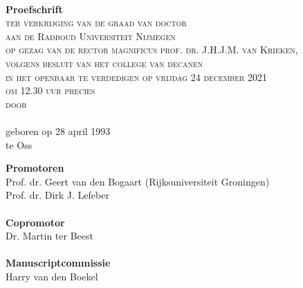 \thispagestyle{empty}
\vspace*{\fill}
\vspace{10pt}
\begin{center}
    \Huge \textcolor{SchoolColor}{\thetitle} \normalsize \\
    \vspace{100pt}
    \large \textbf{Proefschrift} \normalsize \\
    \vspace{50pt}
    \textsc{ter verkrijging van de graad van doctor\\
        aan de Radboud Universiteit Nijmegen\\
        op gezag van de rector magnificus prof. dr. J.H.J.M. van Krieken,\\
        volgens besluit van het college van decanen\\
        in het openbaar te verdedigen op vrijdag 24 december 2021\\
        om 12.30 uur precies\\
        \vspace{20pt}
        door\\
        \vspace{20pt}}
    \large \textbf{\theauthor} \normalsize \\
    \vspace{12pt}
    geboren op 28 april 1993\\
    te Oss
\end{center} \vspace*{\fill}

\newpage
\thispagestyle{empty}
\vspace{120pt}
\noindent \textbf{Promotoren}\\
\noindent Prof. dr. Geert van den Bogaart (Rijksuniversiteit Groningen)\\
\noindent Prof. dr. Dirk J. Lefeber\\
\noindent \\
\noindent \textbf{Copromotor}\\
\noindent Dr. Martin ter Beest\\
\noindent \\
\noindent \textbf{Manuscriptcommissie}\\
\noindent Harry van den Boekel\\
\newpage
\rm

